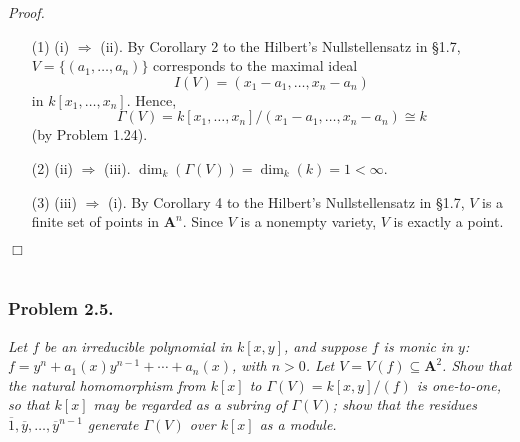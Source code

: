 \documentclass{article}
\begin{document}
\emph{Proof.}
\begin{enumerate}
\item[(1)]
  (i) $\Longrightarrow$ (ii).
  By Corollary 2 to the Hilbert's Nullstellensatz in \S 1.7,
  $V = \{ (a_1,\ldots,a_n) \}$ corresponds to the maximal ideal
  \[
    I(V) = (x_1 - a_1, \ldots, x_n - a_n)
  \]
  in $k[x_1,\ldots,x_n]$.
  Hence,
  \[
    \Gamma(V) = k[x_1,\ldots,x_n]/(x_1 - a_1, \ldots, x_n - a_n) \cong k
  \]
  (by Problem 1.24).

\item[(2)]
  (ii) $\Longrightarrow$ (iii).
  $\dim_k(\Gamma(V)) = \dim_k(k) = 1 < \infty$.

\item[(3)]
  (iii) $\Longrightarrow$ (i).
  By Corollary 4 to the Hilbert's Nullstellensatz in \S 1.7,
  $V$ is a finite set of points in $\mathbf{A}^n$.
  Since $V$ is a nonempty variety, $V$ is exactly a point.
\end{enumerate}
$\Box$ \\\\






\subsubsection*{Problem 2.5.}
\emph{Let $f$ be an irreducible polynomial in $k[x,y]$,
and suppose $f$ is monic in $y$:
$f = y^n + a_1(x) y^{n-1} + \cdots + a_n(x)$, with $n > 0$.
Let $V = V(f) \subseteq \mathbf{A}^2$.
Show that the natural homomorphism from $k[x]$ to $\Gamma(V) = k[x,y]/(f)$ is one-to-one,
so that $k[x]$ may be regarded as a subring of $\Gamma(V)$;
show that the residues $\overline{1}, \overline{y}, \ldots, \overline{y}^{n-1}$
generate $\Gamma(V)$ over $k[x]$ as a module.} \\
\end{document}

